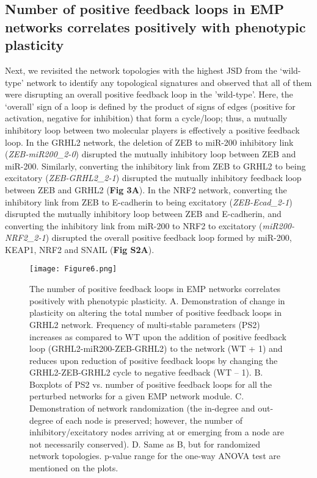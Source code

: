 \documentclass[preprint,review,12pt]{elsarticle}
\begin{document}
	\subsection{Number of positive feedback loops in EMP networks correlates positively with phenotypic plasticity}
	Next, we revisited the network topologies with the highest JSD from the ‘wild-type’ network to identify any topological signatures and observed that all of them were disrupting an overall positive feedback loop in the 'wild-type'. Here, the ‘overall’ sign of a loop is defined by the product of signs of edges (positive for activation, negative for inhibition) that form a cycle/loop; thus, a mutually inhibitory loop between two molecular players is effectively a positive feedback loop. In the GRHL2 network, the deletion of ZEB to miR-200 inhibitory link (\textit{ZEB-miR200\_2-0}) disrupted the mutually inhibitory loop between ZEB and miR-200. Similarly, converting the inhibitory link from ZEB to GRHL2 to being excitatory (\textit{ZEB-GRHL2\_2-1}) disrupted the mutually inhibitory feedback loop between ZEB and GRHL2 (\textbf{Fig 3A}). In the NRF2 network, converting the inhibitory link from ZEB to E-cadherin to being excitatory (\textit{ZEB-Ecad\_2-1}) disrupted the mutually inhibitory loop between ZEB and E-cadherin, and converting the inhibitory link from miR-200 to NRF2 to excitatory (\textit{miR200-NRF2\_2-1}) disrupted the overall positive feedback loop formed by miR-200, KEAP1, NRF2 and SNAIL (\textbf{Fig S2A}).
	
	\begin{figure}[!ht]
		\centering
		\texttt{[image: Figure6.png]}
		\caption{The number of positive feedback loops in EMP networks correlates positively with phenotypic plasticity.
			A.	Demonstration of change in plasticity on altering the total number of positive feedback loops in GRHL2 network. Frequency of multi-stable parameters (PS2) increases as compared to WT upon the addition of positive feedback loop (GRHL2-miR200-ZEB-GRHL2) to the network (WT + 1) and reduces upon reduction of positive feedback loops by changing the GRHL2-ZEB-GRHL2 cycle to negative feedback (WT – 1).
			B.	Boxplots of PS2 vs. number of positive feedback loops for all the perturbed networks for a given EMP network module.
			C.	Demonstration of network randomization (the in-degree and out-degree of each node is preserved; however, the number of inhibitory/excitatory nodes arriving at or emerging from a node are not necessarily conserved). 
			D.	Same as B, but for randomized network topologies. p-value range for the one-way ANOVA test are mentioned on the plots.
		}
		\label{figure6}
	\end{figure}
	
\end{document}
